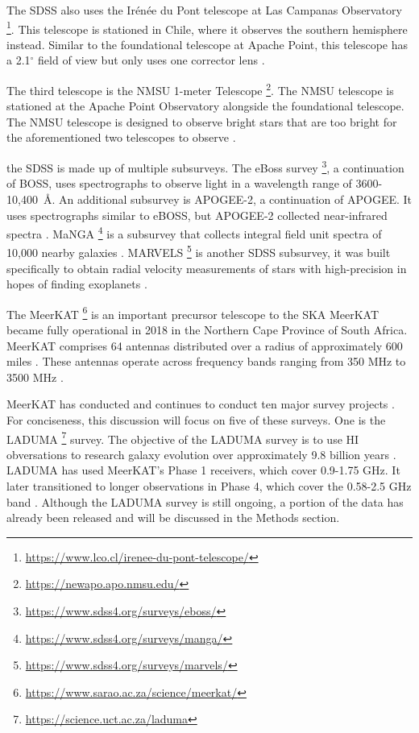 \documentclass[preprint,linenumbers, longauthor]{aastex631}
\begin{document}
The SDSS also uses the Irénée du Pont telescope at Las Campanas Observatory \footnote{\url{https://www.lco.cl/irenee-du-pont-telescope/}}. This telescope is stationed in Chile, where it observes the southern hemisphere instead. 
Similar to the foundational telescope at Apache Point, this telescope has a 2.1$^\circ$ field of view but only uses one corrector lens \cite{bowenOpticalDesign40in1973}.

The third telescope is the NMSU 1-meter Telescope \footnote{\url{https://newapo.apo.nmsu.edu/}}. The NMSU telescope is stationed at the Apache Point Observatory alongside the foundational telescope. 
The NMSU telescope is designed to observe bright stars that are too bright for the aforementioned two telescopes to observe \citep{majewskiApachePointObservatory2017}. 

the SDSS is made up of multiple subsurveys. The eBoss survey \footnote{\url{https://www.sdss4.org/surveys/eboss/}}, a continuation of BOSS, uses spectrographs to observe light in a wavelength range of 3600-10,400~\AA \space \citep{dawsonSDSSIVEXTENDEDBARYON2016}.
An additional subsurvey is APOGEE-2, a continuation of APOGEE. It uses spectrographs similar to eBOSS, but APOGEE-2 collected near-infrared spectra \citep{majewskiApachePointObservatory2017}. 
MaNGA \footnote{\url{https://www.sdss4.org/surveys/manga/}} is a subsurvey that collects integral field unit spectra of 10,000 nearby galaxies \citep{bundyOVERVIEWSDSSIVMaNGA2014}.
MARVELS \footnote{\url{https://www.sdss4.org/surveys/marvels/}} is another SDSS subsurvey, it was built specifically to obtain radial velocity measurements of stars with high-precision in hopes of finding exoplanets \citep{bundyOVERVIEWSDSSIVMaNGA2014a}.


The MeerKAT \footnote{\url{https://www.sarao.ac.za/science/meerkat/}} is an important precursor telescope to the SKA \citep{jonasMeerKATRadioTelescope2018}
MeerKAT became fully operational in 2018 in the Northern Cape Province of South Africa.
MeerKAT comprises 64 antennas distributed over a radius of approximately 600 miles \citep{goedhartMeerKATSpecifications2025}. These antennas operate across frequency bands ranging from 350 MHz to 3500 MHz \citep{goedhartMeerKATSpecifications2025}.

MeerKAT has conducted and continues to conduct ten major survey projects \citep{jonasMeerKATRadioTelescope2018}. For conciseness, this discussion will focus on five of these surveys.
One is the LADUMA \footnote{\url{https://science.uct.ac.za/laduma}} survey.
The objective of the LADUMA survey is to use HI obversations to research galaxy evolution over approximately 9.8 billion years \citep{blythLADUMALookingDistant2018}. 
LADUMA has used MeerKAT's Phase 1 receivers, which cover 0.9-1.75 GHz. It later transitioned to longer observations in Phase 4, which cover the 0.58-2.5 GHz band \citep{blythLADUMALookingDistant2018}.
Although the LADUMA survey is still ongoing, a portion of the data has already been released and will be discussed in the Methods section.
\end{document}
